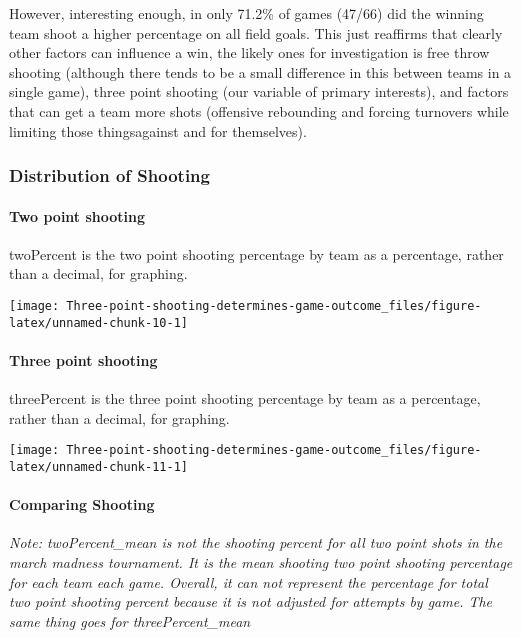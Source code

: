 \documentclass[
]{article}
\begin{document}
However, interesting enough, in only 71.2\% of games (47/66) did the
winning team shoot a higher percentage on all field goals. This just
reaffirms that clearly other factors can influence a win, the likely
ones for investigation is free throw shooting (although there tends to
be a small difference in this between teams in a single game), three
point shooting (our variable of primary interests), and factors that can
get a team more shots (offensive rebounding and forcing turnovers while
limiting those thingsagainst and for themselves).

\hypertarget{distribution-of-shooting}{%
\subsubsection{Distribution of
Shooting}\label{distribution-of-shooting}}

\hypertarget{two-point-shooting}{%
\paragraph{Two point shooting}\label{two-point-shooting}}

twoPercent is the two point shooting percentage by team as a percentage,
rather than a decimal, for graphing.

\begin{center}\texttt{[image: Three-point-shooting-determines-game-outcome\_files/figure-latex/unnamed-chunk-10-1]} \end{center}

\hypertarget{three-point-shooting}{%
\paragraph{Three point shooting}\label{three-point-shooting}}

threePercent is the three point shooting percentage by team as a
percentage, rather than a decimal, for graphing.

\begin{center}\texttt{[image: Three-point-shooting-determines-game-outcome\_files/figure-latex/unnamed-chunk-11-1]} \end{center}

\hypertarget{comparing-shooting}{%
\paragraph{Comparing Shooting}\label{comparing-shooting}}

\emph{Note: twoPercent\_mean is not the shooting percent for all two
point shots in the march madness tournament. It is the mean shooting two
point shooting percentage for each team each game. Overall, it can not
represent the percentage for total two point shooting percent because it
is not adjusted for attempts by game. The same thing goes for
threePercent\_mean}
\end{document}
